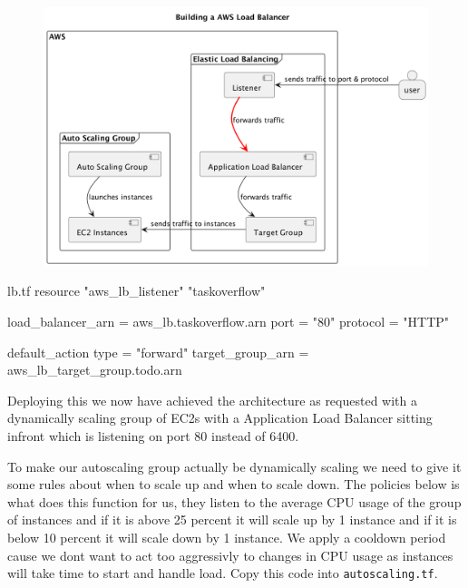 \documentclass{csse4400}
\begin{document}
\begin{figure}[H]
  \begin{center}
    \includegraphics[scale=0.2]{diagrams/lb4}
  \end{center}
\end{figure}

\begin{code}[language=terraform,numbers=none,keepspaces=true]{lb.tf}
resource "aws_lb_listener" "taskoverflow" {
  load_balancer_arn = aws_lb.taskoverflow.arn
  port              = "80"
  protocol          = "HTTP"

  default_action {
    type             = "forward"
    target_group_arn = aws_lb_target_group.todo.arn
  }
}
\end{code}

Deploying this we now have achieved the architecture as requested with a dynamically scaling group of EC2s with a Application Load Balancer sitting infront which is listening on port 80 instead of 6400.

To make our autoscaling group actually be dynamically scaling we need to give it some rules about when to scale up and when to scale down. The policies below is what does this function for us, they listen to the average CPU usage of the group of instances and if it is above 25 percent it will scale up by 1 instance and if it is below 10 percent it will scale down by 1 instance. We apply a cooldown period cause we dont want to act too aggressivly to changes in CPU usage as instances will take time to start and handle load. Copy this code into \texttt{autoscaling.tf}.
\end{document}
